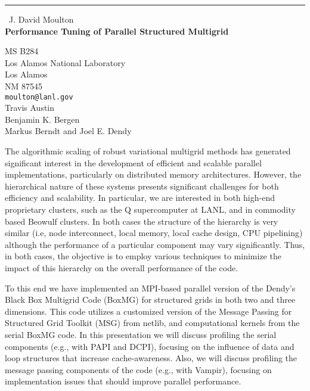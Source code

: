 \documentclass{report}
\begin{document}
\begin{center}
\rule{6in}{1pt} \
{\large J. David Moulton \\
{\bf Performance Tuning of Parallel Structured Multigrid}}

MS B284 \\ Los Alamos National Laboratory \\ Los Alamos \\ NM 87545
\\
{\tt moulton@lanl.gov}\\
Travis Austin\\
Benjamin K. Bergen\\
	Markus Berndt and Joel E. Dendy\end{center}

The algorithmic scaling of robust variational multigrid methods has
generated significant interest in the development of efficient and
scalable parallel implementations, particularly on distributed memory
architectures. However, the hierarchical nature of these systems presents
significant challenges for both efficiency and scalability. In
particular, we are interested in both high-end proprietary clusters, such
as the Q supercomputer at LANL, and in commodity based Beowulf clusters.
In both cases the structure of the hierarchy is very similar (i.e, node
interconnect, local memory, local cache design, CPU pipelining) although
the performance of a particular component may vary significantly. Thus,
in both cases, the objective is to employ various techniques to minimize
the impact of this hierarchy on the overall performance of the code.

To this end we have implemented an MPI-based parallel version of the
Dendy's Black Box Multigrid Code (BoxMG) for structured grids in both two
and three dimensions. This code utilizes a customized version of the
Message Passing for Structured Grid Toolkit (MSG) from netlib, and
computational kernels from the serial BoxMG code. In this presentation we
will discuss profiling the serial components (e.g., with PAPI and DCPI),
focusing on the influence of data and loop structures that increase
cache-awareness. Also, we will discuss profiling the message passing
components of the code (e.g., with Vampir), focusing on implementation
issues that should improve parallel performance.
\end{document}
